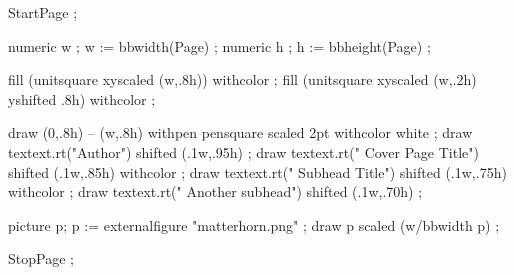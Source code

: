 
\startMPpage

    StartPage ;

    numeric w ; w := bbwidth(Page) ;
    numeric h ; h := bbheight(Page) ;

    fill (unitsquare xyscaled (w,.8h)) withcolor  ;
    fill (unitsquare xyscaled (w,.2h) yshifted .8h) withcolor  ;
  
      draw (0,.8h) -- (w,.8h) withpen pensquare scaled 2pt withcolor white ;
draw textext.rt("Author") shifted (.1w,.95h) ;
    draw textext.rt(" Cover Page Title") shifted (.1w,.85h) withcolor  ;
        draw textext.rt(" Subhead Title") shifted (.1w,.75h) withcolor  ;
    draw textext.rt(" Another subhead") shifted (.1w,.70h) ;

    picture p; p := externalfigure "matterhorn.png" ;
    draw p scaled (w/bbwidth p) ;

    StopPage ;

\stopMPpage
